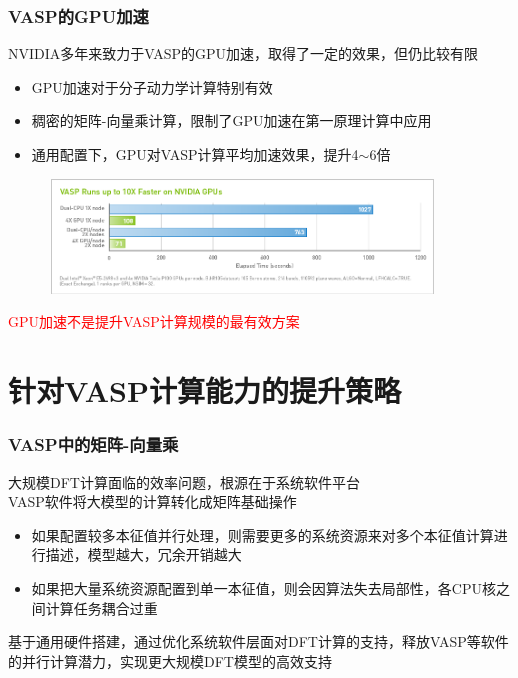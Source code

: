 \frame
{
	\frametitle{\textrm{VASP}的\textrm{GPU}加速}
\textrm{NVIDIA}多年来致力于\textrm{VASP}的\textrm{GPU}加速，取得了一定的效果，但仍比较有限
\begin{itemize}
	\item \textrm{GPU}加速对于分子动力学计算特别有效
	\item 稠密的矩阵-向量乘计算，限制了\textrm{GPU}加速在第一原理计算中应用
	\item 通用配置下，\textrm{GPU}对\textrm{VASP}计算平均加速效果，提升\textrm{4$\sim$6}倍
\end{itemize}
\begin{figure}[h!]
	\vspace{-0.15in}
\centering
\includegraphics[height=1.2in,width=4.05in,viewport=0 0 850 260,clip]{Figures/VASP-GPU-CPU.png}
\label{VASP_GPU}
\end{figure} 
	\vspace{-0.15in}
\textcolor{red}{\textrm{GPU}加速不是提升\textrm{VASP}计算规模的最有效方案}
}

\section{针对\rm{VASP}计算能力的提升策略}
\begin{frame}
	\frametitle{\textrm{VASP}中的矩阵-向量乘}
	大规模\textrm{DFT}计算面临的效率问题，根源在于系统软件平台\\
	{\fontsize{7.2pt}{5.2pt}}
	\vskip 3pt 
\textrm{VASP}软件将大模型的计算转化成矩阵基础操作\\
{\fontsize{7.2pt}{5.2pt}}
	\begin{itemize}
		\item 如果配置较多本征值并行处理，则需要更多的系统资源来对多个本征值计算进行描述，模型越大，冗余开销越大\\
			{\fontsize{7.2pt}{5.2pt}\selectfont{有可能影响实用性，甚至超过了现有计算机集群的处理极限}}
		\item 如果把大量系统资源配置到单一本征值，则会因算法失去局部性，各\textrm{CPU}核之间计算任务耦合过重\\
	{\fontsize{7.2pt}{5.2pt}\selectfont{有可能造成系统过载}}
	\end{itemize}
	基于通用硬件搭建，通过优化系统软件层面对\textrm{DFT}计算的支持，释放\textrm{VASP}等软件的并行计算潜力，实现更大规模\textrm{DFT}模型的高效支持
\end{frame}

